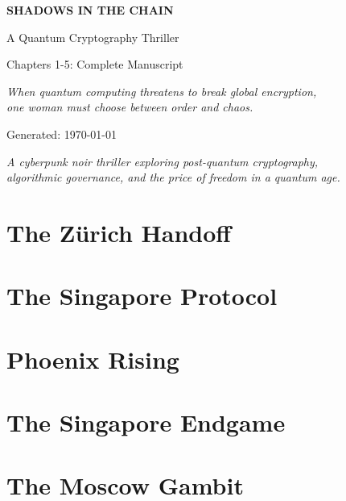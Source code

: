 \documentclass[12pt,letterpaper]{book}
\begin{document}
\begin{titlepage}
\centering
\vspace*{2cm}

{\Huge\bfseries\color{neonblue}SHADOWS IN THE CHAIN\par}
\vspace{1cm}
{\LARGE\color{neongreen}A Quantum Cryptography Thriller\par}
\vspace{2cm}

{\Large\color{neonpink}Chapters 1-5: Complete Manuscript\par}
\vspace{1cm}

{\large\textit{When quantum computing threatens to break global encryption,\\
one woman must choose between order and chaos.}\par}

\vspace{3cm}

{\large\color{neonblue}Generated: \today\par}

\vfill

{\small\textit{A cyberpunk noir thriller exploring post-quantum cryptography,\\
algorithmic governance, and the price of freedom in a quantum age.}\par}

\end{titlepage}

\tableofcontents
\newpage

\chapter{The Zürich Handoff}


\chapter{The Singapore Protocol}


\chapter{Phoenix Rising}


\chapter{The Singapore Endgame}


\chapter{The Moscow Gambit}

\end{document}
